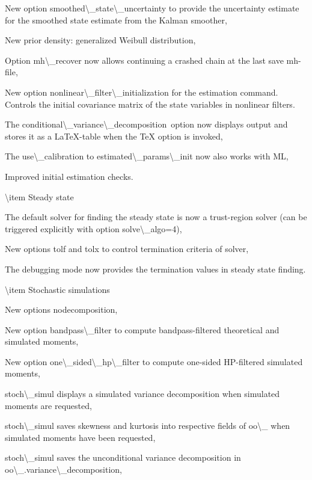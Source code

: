 \documentclass[10pt,math=newtx,citestyle=gb7714-2015,bibstyle=gb7714-2015]{elegantbook}
\begin{document}
	
	New option smoothed\textbackslash{}\_state\textbackslash{}\_uncertainty to provide the uncertainty estimate for the smoothed state estimate from the Kalman smoother,
	
	
	New prior density: generalized Weibull distribution,
	
	
	Option mh\textbackslash{}\_recover now allows continuing a crashed chain at the last save mh-file,
	
	
	New option nonlinear\textbackslash{}\_filter\textbackslash{}\_initialization for the estimation command. Controls the initial covariance matrix of the state variables in nonlinear filters.
	
	
	The conditional\textbackslash{}\_variance\textbackslash{}\_decomposition option now displays output and stores it as a LaTeX-table when the TeX option is invoked,
	
	
	The use\textbackslash{}\_calibration to estimated\textbackslash{}\_params\textbackslash{}\_init now also works with ML,
	
	
	Improved initial estimation checks.
	
	
	
	
	\textbackslash{}item Steady state
	
	
	The default solver for finding the steady state is now a trust-region solver (can be triggered explicitly with option
	solve\textbackslash{}\_algo=4),
	
	
	New options tolf and tolx to control termination criteria of solver,
	
	
	The debugging mode now provides the termination values in steady state finding.
	
	
	
	
	\textbackslash{}item Stochastic simulations
	
	
	New options nodecomposition,
	
	
	New option bandpass\textbackslash{}\_filter to compute bandpass-filtered theoretical and simulated moments,
	
	
	New option one\textbackslash{}\_sided\textbackslash{}\_hp\textbackslash{}\_filter to compute one-sided HP-filtered simulated moments,
	
	
	stoch\textbackslash{}\_simul displays a simulated variance decomposition when simulated moments are requested,
	
	
	stoch\textbackslash{}\_simul saves skewness and kurtosis into respective fields of oo\textbackslash{}\_ when simulated moments have been requested,
	
	
	stoch\textbackslash{}\_simul saves the unconditional variance decomposition in oo\textbackslash{}\_.variance\textbackslash{}\_decomposition,
	
\end{document}
